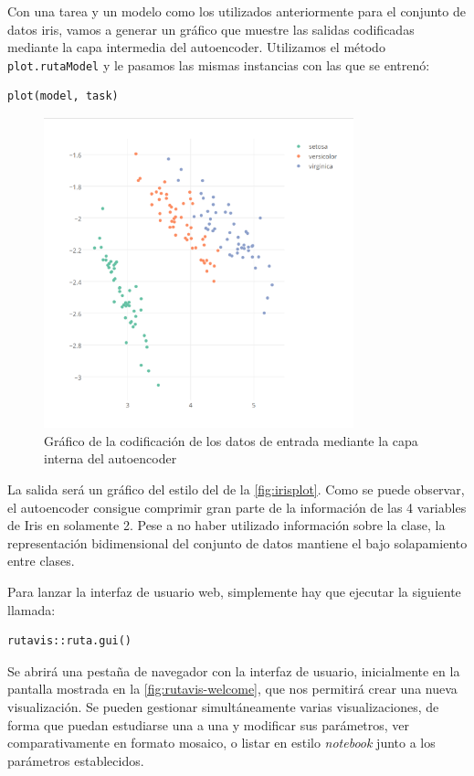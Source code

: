 \begin{example}
  Con una tarea y un modelo como los utilizados anteriormente para el conjunto de datos iris, vamos a generar un gráfico que muestre las salidas codificadas mediante la capa intermedia del autoencoder. Utilizamos el método \texttt{plot.rutaModel} y le pasamos las mismas instancias con las que se entrenó:
\begin{lstlisting}[numbers=none]
plot(model, task)
\end{lstlisting}
\begin{figure}[hbtp]
  \centering
  \includegraphics[width=0.8\textwidth]{images/rutavis_iris.png}
  \caption{\label{fig:irisplot}Gráfico de la codificación de los datos de entrada mediante la capa interna del autoencoder}
\end{figure}

La salida será un gráfico del estilo del de la \autoref{fig:irisplot}. 
Como se puede observar, el autoencoder consigue comprimir gran parte de la información de las 4 variables de Iris en solamente 2. Pese a no haber utilizado información sobre la clase, la representación bidimensional del conjunto de datos mantiene el bajo solapamiento entre clases.
\end{example}

Para lanzar la interfaz de usuario web, simplemente hay que ejecutar la siguiente llamada:
\begin{lstlisting}[numbers=none]
rutavis::ruta.gui()
\end{lstlisting}

Se abrirá una pestaña de navegador con la interfaz de usuario, inicialmente en la pantalla mostrada en la \autoref{fig:rutavis-welcome}, que nos permitirá crear una nueva visualización. Se pueden gestionar simultáneamente varias visualizaciones, de forma que puedan estudiarse una a una y modificar sus parámetros, ver comparativamente en formato mosaico, o listar en estilo \emph{notebook} junto a los parámetros establecidos.

